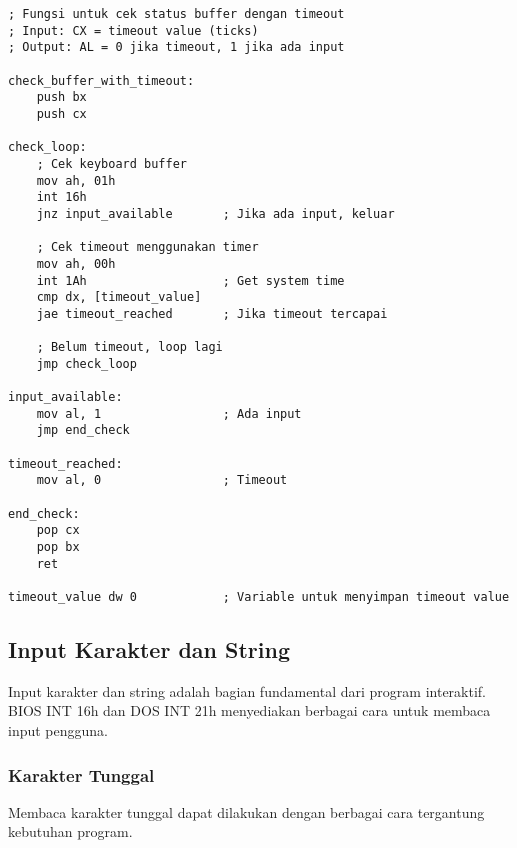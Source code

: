 \documentclass[../main.tex]{subfiles}
\begin{document}
\begin{lstlisting}[language={[x86masm]Assembler}, caption=Status Keyboard Buffer dengan Timeout, label={lst:buffer-status}]
; Fungsi untuk cek status buffer dengan timeout
; Input: CX = timeout value (ticks)
; Output: AL = 0 jika timeout, 1 jika ada input

check_buffer_with_timeout:
    push bx
    push cx
    
check_loop:
    ; Cek keyboard buffer
    mov ah, 01h
    int 16h
    jnz input_available       ; Jika ada input, keluar
    
    ; Cek timeout menggunakan timer
    mov ah, 00h
    int 1Ah                   ; Get system time
    cmp dx, [timeout_value]
    jae timeout_reached       ; Jika timeout tercapai
    
    ; Belum timeout, loop lagi
    jmp check_loop
    
input_available:
    mov al, 1                 ; Ada input
    jmp end_check
    
timeout_reached:
    mov al, 0                 ; Timeout
    
end_check:
    pop cx
    pop bx
    ret
    
timeout_value dw 0            ; Variable untuk menyimpan timeout value
\end{lstlisting}

\subsection{Input Karakter dan String}
            Input karakter dan string adalah bagian fundamental dari program interaktif. BIOS INT 16h dan DOS INT 21h menyediakan berbagai cara untuk membaca input pengguna.

            \subsubsection{Karakter Tunggal}
Membaca karakter tunggal dapat dilakukan dengan berbagai cara tergantung kebutuhan program.
\end{document}
